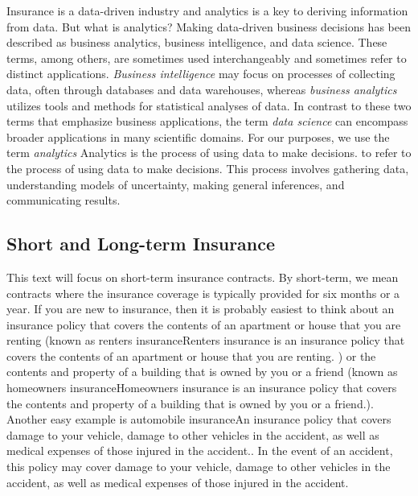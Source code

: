 \documentclass[]{book}
\theoremstyle{definition}
\theoremstyle{definition}
\theoremstyle{definition}
\theoremstyle{remark}
\begin{document}
Insurance is a data-driven industry and analytics is a key to deriving
information from data. But what is analytics? Making data-driven
business decisions has been described as business analytics, business
intelligence, and data science. These terms, among others, are sometimes
used interchangeably and sometimes refer to distinct applications.
\emph{Business intelligence} may focus on processes of collecting data,
often through databases and data warehouses, whereas \emph{business
analytics} utilizes tools and methods for statistical analyses of data.
In contrast to these two terms that emphasize business applications, the
term \emph{data science} can encompass broader applications in many
scientific domains. For our purposes, we use the term \emph{analytics}{
Analytics is the process of using data to make decisions.} to refer to
the process of using data to make decisions. This process involves
gathering data, understanding models of uncertainty, making general
inferences, and communicating results.

\subsection{Short and Long-term
Insurance}\label{short-and-long-term-insurance}

This text will focus on short-term insurance contracts. By short-term,
we mean contracts where the insurance coverage is typically provided for
six months or a year. If you are new to insurance, then it is probably
easiest to think about an insurance policy that covers the contents of
an apartment or house that you are renting (known as renters
insurance{Renters insurance is an insurance policy that covers the
contents of an apartment or house that you are renting.} ) or the
contents and property of a building that is owned by you or a friend
(known as homeowners insurance{Homeowners insurance is an insurance
policy that covers the contents and property of a building that is owned
by you or a friend.}). Another easy example is automobile insurance{An
insurance policy that covers damage to your vehicle, damage to other
vehicles in the accident, as well as medical expenses of those injured
in the accident.}. In the event of an accident, this policy may cover
damage to your vehicle, damage to other vehicles in the accident, as
well as medical expenses of those injured in the accident.
\end{document}
